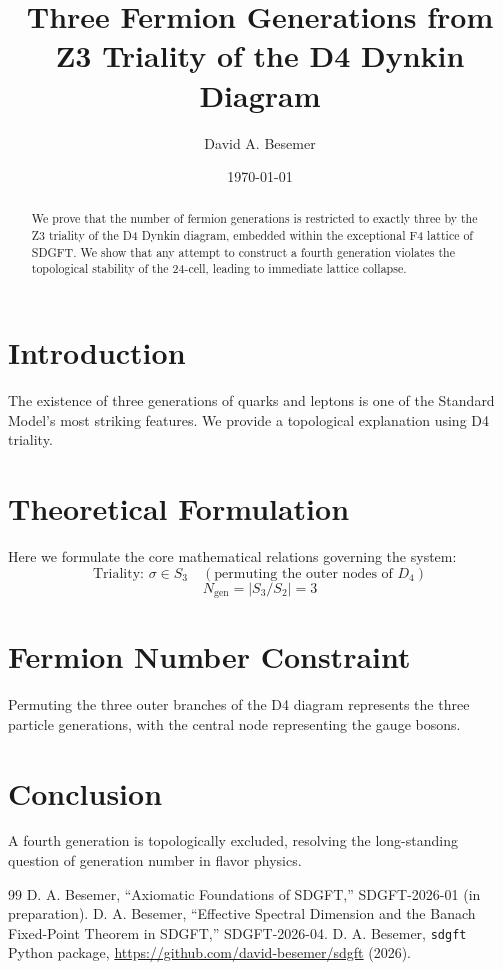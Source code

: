 \documentclass[amsmath,amssymb,aps,prd,twocolumn,superscriptaddress,nofootinbib]{revtex4-2}
\begin{document}

\title{Three Fermion Generations from Z3 Triality of the D4 Dynkin Diagram}

\author{David A. Besemer}

\date{\today}

\begin{abstract}
We prove that the number of fermion generations is restricted to exactly three by the Z3 triality of the D4 Dynkin diagram, embedded within the exceptional F4 lattice of SDGFT. We show that any attempt to construct a fourth generation violates the topological stability of the 24-cell, leading to immediate lattice collapse.
\end{abstract}

\maketitle

\section{Introduction}
The existence of three generations of quarks and leptons is one of the Standard Model's most striking features. We provide a topological explanation using D4 triality.

\section{Theoretical Formulation}
Here we formulate the core mathematical relations governing the system:
\begin{equation}
  \text{Triality: } \sigma \in S_3 \quad (\text{permuting the outer nodes of } D_4)
\end{equation}
\begin{equation}
  N_{\text{gen}} = \lvert S_3 / S_2 \rvert = 3
\end{equation}
\section{Fermion Number Constraint}
Permuting the three outer branches of the D4 diagram represents the three particle generations, with the central node representing the gauge bosons.

\section{Conclusion}
A fourth generation is topologically excluded, resolving the long-standing question of generation number in flavor physics.



\begin{thebibliography}{99}
 D. A. Besemer, ``Axiomatic Foundations of SDGFT,'' SDGFT-2026-01 (in preparation).
 D. A. Besemer, ``Effective Spectral Dimension and the Banach Fixed-Point Theorem in SDGFT,'' SDGFT-2026-04.
 D. A. Besemer, \texttt{sdgft} Python package, \url{https://github.com/david-besemer/sdgft} (2026).
\end{thebibliography}
\end{document}
